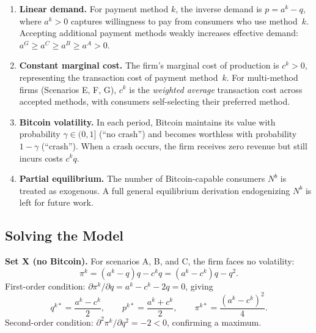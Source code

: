 \documentclass{article}
\begin{document}
\begin{enumerate}
  \item \textbf{Linear demand.}
        For payment method $k$, the inverse demand is $p = a^k - q$, where
        $a^k > 0$ captures willingness to pay from consumers who use method~$k$.
        Accepting additional payment methods weakly increases effective demand:
        $a^G \geq a^C \geq a^B \geq a^A > 0$.
  \item \textbf{Constant marginal cost.}
        The firm's marginal cost of production is $c^k > 0$, representing the
        transaction cost of payment method~$k$.
        For multi-method firms (Scenarios E, F, G), $c^k$ is the
        \emph{weighted average} transaction cost across accepted methods, with
        consumers self-selecting their preferred method.
  \item \textbf{Bitcoin volatility.}
        In each period, Bitcoin maintains its value with probability $\gamma \in (0,1]$
        (``no crash'') and becomes worthless with probability $1-\gamma$ (``crash'').
        When a crash occurs, the firm receives zero revenue but still incurs
        costs $c^k q$.
  \item \textbf{Partial equilibrium.}
        The number of Bitcoin-capable consumers $N^b$ is treated as exogenous.
        A full general equilibrium derivation endogenizing $N^b$ is left for
        future work.
\end{enumerate}

\subsection{Solving the Model}
\label{sec:solving}

\textbf{Set X (no Bitcoin).}
For scenarios A, B, and C, the firm faces no volatility:
\begin{equation}
  \pi^k = (a^k - q)q - c^k q = (a^k - c^k)q - q^2.
  \label{eq:setX_profit}
\end{equation}
First-order condition: $\partial \pi^k / \partial q = a^k - c^k - 2q = 0$,
giving
\begin{equation}
  q^{k*} = \frac{a^k - c^k}{2}, \qquad
  p^{k*} = \frac{a^k + c^k}{2}, \qquad
  \pi^{k*} = \frac{(a^k - c^k)^2}{4}.
  \label{eq:setX_eq}
\end{equation}
Second-order condition: $\partial^2 \pi^k / \partial q^2 = -2 < 0$, confirming
a maximum.
\end{document}
